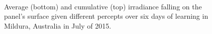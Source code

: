\documentclass{article}
\begin{document}
\begin{figure}[t]
\begin{center}
	 \\ %
	 \hspace{1mm} %
	 \hspace{1mm} %
\caption{Average (bottom) and cumulative (top) irradiance falling on the panel's surface given different percepts over six days of learning in Mildura, Australia in July of 2015.}
\label{fig:results_aus}
\end{center}
\end{figure}
\end{document}
